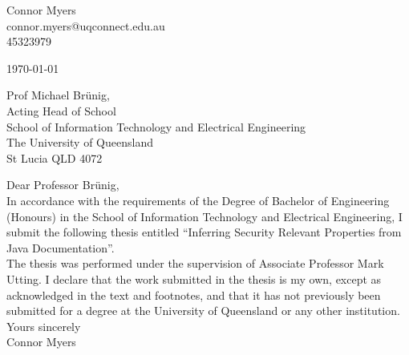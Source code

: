\thispagestyle{empty}

\begin{flushright}
    Connor Myers \\
    connor.myers@uqconnect.edu.au \\ 
    45323979
\end{flushright}

\vspace{2cm}

\noindent
\today

\vspace{1cm}

\noindent
Prof Michael Brünig, \\
\noindent
Acting Head of School \\
\noindent
School of Information Technology and Electrical Engineering \\ 
\noindent
The University of Queensland \\
\noindent
St Lucia  QLD  4072

\vspace{1cm}

\noindent
Dear Professor Brünig, \\

\noindent
In accordance with the requirements of the Degree of {Bachelor of Engineering (Honours)} in the School of Information Technology and Electrical Engineering, I submit the following thesis entitled ``Inferring Security Relevant Properties from Java Documentation''. \\

\noindent
The thesis was performed under the supervision of Associate Professor Mark Utting. I declare that the work submitted in the thesis is my own, except as acknowledged in the text and footnotes, and that it has not previously been submitted for a degree at the University of Queensland or any other institution. \\

\noindent
Yours sincerely \\

\noindent
Connor Myers